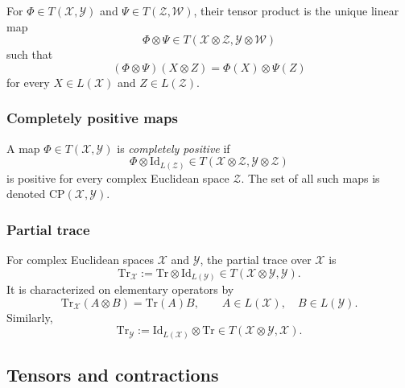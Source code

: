 \documentclass[
    aps,
    pra,
    reprint,
    superscriptaddress,
    nofootinbib
]{revtex4-2}
\theoremstyle{definition}
\theoremstyle{plain}
\begin{document}
For $\Phi\in T(\mathcal{X},\mathcal{Y})$ and
$\Psi\in T(\mathcal{Z},\mathcal{W})$, their tensor product is the unique
linear map
\begin{equation}
    \Phi\otimes\Psi
    \in
    T(\mathcal{X}\otimes\mathcal{Z},
      \mathcal{Y}\otimes\mathcal{W})
\end{equation}
such that
\begin{equation}
    (\Phi\otimes\Psi)(X\otimes Z)
    =
    \Phi(X)\otimes\Psi(Z)
\end{equation}
for every $X\in L(\mathcal{X})$ and $Z\in L(\mathcal{Z})$.

\subsubsection{Completely positive maps}

A map $\Phi\in T(\mathcal{X},\mathcal{Y})$ is \emph{completely positive} if
\begin{equation}
    \Phi\otimes\mathrm{Id}_{L(\mathcal{Z})}
    \in
    T(\mathcal{X}\otimes\mathcal{Z},
      \mathcal{Y}\otimes\mathcal{Z})
\end{equation}
is positive for every complex Euclidean space $\mathcal{Z}$. The set of all
such maps is denoted $\mathrm{CP}(\mathcal{X},\mathcal{Y})$.

\subsubsection{Partial trace}

For complex Euclidean spaces $\mathcal{X}$ and $\mathcal{Y}$, the partial
trace over $\mathcal{X}$ is
\begin{equation}
    \mathrm{Tr}_{\mathcal{X}}
    :=
    \mathrm{Tr}\otimes\mathrm{Id}_{L(\mathcal{Y})}
    \in T(\mathcal{X}\otimes\mathcal{Y},\mathcal{Y}).
\end{equation}
It is characterized on elementary operators by
\begin{equation}
    \mathrm{Tr}_{\mathcal{X}}(A\otimes B)
    =
    \mathrm{Tr}(A)B,
    \qquad
    A\in L(\mathcal{X}),\quad B\in L(\mathcal{Y}).
\end{equation}
Similarly,
\begin{equation}
    \mathrm{Tr}_{\mathcal{Y}}
    :=
    \mathrm{Id}_{L(\mathcal{X})}\otimes\mathrm{Tr}
    \in T(\mathcal{X}\otimes\mathcal{Y},\mathcal{X}).
\end{equation}

\subsection{Tensors and contractions}
\label{subsec:tensors-contractions}
\end{document}
